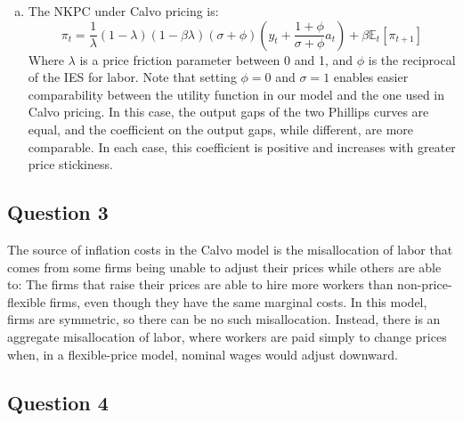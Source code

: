 \documentclass{article}
\newcommand{\Et}[1]{\mathbb{E}_t\left[#1\right]}
\begin{document}
\begin{enumerate}[(a)]
	\item The NKPC under Calvo pricing is:
		\[
			\pi_t = \frac{1}{\lambda}(1-\lambda)(1-\beta\lambda)(\sigma + \phi)\left(y_t + \frac{1+\phi}{\sigma+\phi}a_t\right) + \beta\Et{\pi_{t+1}}
		\]
		Where $\lambda$ is a price friction parameter between 0 and 1, and $\phi$ is the reciprocal of the IES for labor. Note that setting ${\phi=0}$ and ${\sigma=1}$ enables easier comparability between the utility function in our model and the one used in Calvo pricing. In this case, the output gaps of the two Phillips curves are equal, and the coefficient on the output gaps, while different, are more comparable. In each case, this coefficient is positive and increases with greater price stickiness.
	
\end{enumerate}




\subsection*{Question 3}

The source of inflation costs in the Calvo model is the misallocation of labor that comes from some firms being unable to adjust their prices while others are able to: The firms that raise their prices are able to hire more workers than non-price-flexible firms, even though they have the same marginal costs. In this model, firms are symmetric, so there can be no such misallocation. Instead, there is an aggregate misallocation of labor, where workers are paid simply to change prices when, in a flexible-price model, nominal wages would adjust downward.


\pagebreak
\subsection*{Question 4}
\end{document}
